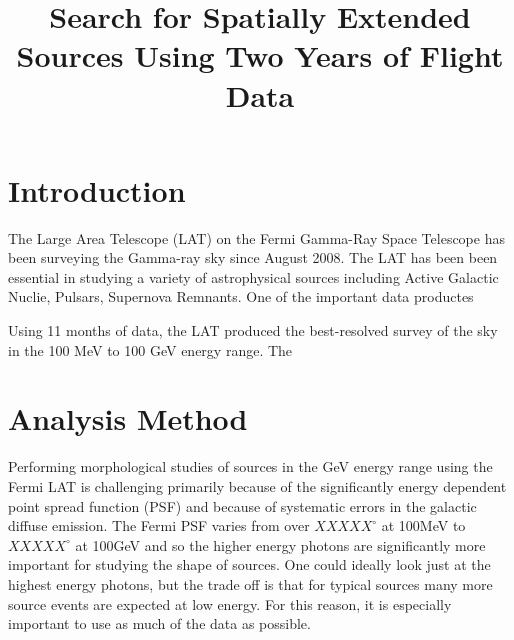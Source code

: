 \documentclass[12pt]{article}
\title{Search for Spatially Extended Sources Using Two Years of Flight
Data}
\begin{document}
\maketitle


\section{Introduction}



The Large Area Telescope (LAT) on the Fermi Gamma-Ray Space Telescope
has been surveying the Gamma-ray sky since August 2008. The LAT has been
been essential in studying a variety of astrophysical sources including
Active Galactic Nuclie, Pulsars, Supernova Remnants. 
One of the important data productes 

Using 11 months of data, the LAT produced the best-resolved survey of the sky
in the 100 MeV to 100 GeV energy range\cite{2FGL Paper}. The


\section{Analysis Method}


%

Performing morphological studies of sources in the GeV energy range using
the Fermi LAT is challenging primarily because of the significantly energy
dependent point spread function (PSF) and because of systematic errors in the
galactic diffuse emission. The Fermi PSF varies from over $XXXXX^\circ$
at 100MeV to $XXXXX^\circ$ at 100GeV and so the higher energy photons are
significantly more important for studying the shape of sources. One could
ideally look just at the highest energy photons, but the trade off is that
for typical sources many more source events are expected at low energy.
For this reason, it is especially important to use as much of the data
as possible.
\end{document}
